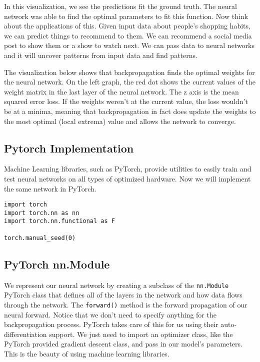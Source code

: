 \documentclass[openany]{book}
\begin{document}
In this visualization, we see the predictions fit the ground truth. The
neural network was able to find the optimal parameters to fit this
function. Now think about the applications of this. Given input data
about people's shopping habits, we can predict things to recommend to
them. We can recommend a social media post to show them or a show to
watch next. We can pass data to neural networks and it will uncover
patterns from input data and find patterns.
        
    The visualization below shows that backpropagation finds the optimal
weights for the neural network. On the left graph, the red dot shows the
current values of the weight matrix in the last layer of the neural
network. The z axis is the mean squared error loss. If the weights
weren't at the current value, the loss wouldn't be at a minima, meaning
that backpropagation in fact does update the weights to the most optimal
(local extrema) value and allows the network to converge.
        
    \subsection{Pytorch Implementation}\label{pytorch-implementation}

Machine Learning libraries, such as PyTorch, provide utilities to easily
train and test neural networks on all types of optimized hardware. Now
we will implement the same network in PyTorch.

\begin{tcolorbox}
\tiny
\begin{verbatim}
import torch
import torch.nn as nn
import torch.nn.functional as F

torch.manual_seed(0)
\end{verbatim}
\end{tcolorbox}
        
    \subsection{PyTorch nn.Module}\label{pytorch-nn.module}

We represent our neural network by creating a subclass of the
\texttt{nn.Module} PyTorch class that defines all of the layers in the
network and how data flows through the network. The \texttt{forward()}
method is the forward propagation of our neural forward. Notice that we
don't need to specify anything for the backpropagation process. PyTorch
takes care of this for us using their auto-differentiation support. We
just need to import an optimizer class, like the PyTorch provided
gradient descent class, and pass in our model's parameters. This is the
beauty of using machine learning libraries.
\end{document}
